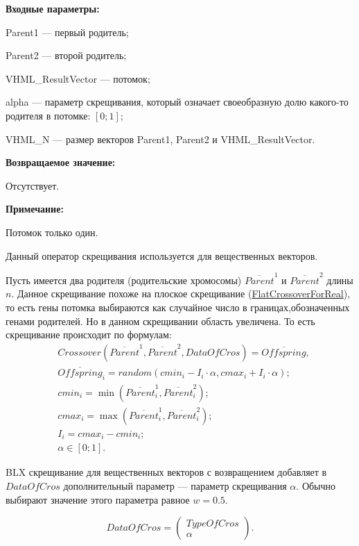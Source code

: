 \textbf{Входные параметры:}
 
Parent1 --- первый родитель;
 
Parent2 --- второй родитель;
 
VHML\_ResultVector --- потомок;

alpha --- параметр скрещивания, который означает своеобразную долю какого-то родителя в потомке: $[0;1]$;
 
VHML\_N --- размер векторов Parent1, Parent2 и VHML\_ResultVector.

\textbf{Возвращаемое значение:}

 Отсутствует.
 
\textbf{ Примечание:}

Потомок только один.
 
Данный оператор скрещивания используется для вещественных векторов.

Пусть имеется два родителя (родительские хромосомы) $ \overline{Parent}^1 $ и $ \overline{Parent}^2$ длины $n$. Данное скрещивание похоже на плоское скрещивание (\hyperref[SetOfOperatorsAlgorithms:FlatCrossoverForReal]{FlatCrossoverForReal}), то есть гены потомка выбираются как случайное число в границах,обозначенных генами родителей. Но в данном скрещивании область увеличена. То есть скрещивание происходит по формулам:
\begin{align}
\label{SetOfOperatorsAlgorithms:eq:BLXCrossoverForReal}
&Crossover \left( \overline{Parent}^1, \overline{Parent}^2, DataOfCros\right)= \overline{Offspring}, \\
& \overline{Offspring}_i=random\left(cmin_i-I_i\cdot \alpha, cmax_i+I_i\cdot \alpha\right);\nonumber\\
& cmin_i = \min\left(\overline{Parent}^1_i, \overline{Parent}^2_i \right);\nonumber\\
& cmax_i = \max\left(\overline{Parent}^1_i, \overline{Parent}^2_i \right);\nonumber\\
& I_i = cmax_i-cmin_i;\nonumber\\
&\alpha\in \left[ 0; 1\right].\nonumber
\end{align}

BLX скрещивание для вещественных векторов с возвращением добавляет в $ DataOfCros $ дополнительный параметр --- параметр скрещивания $ \alpha $. Обычно выбирают значение этого параметра равное $ w=0.5 $.

\begin{equation}
DataOfCros=\left( \begin{array}{c} TypeOfCros \\ \alpha \end{array} \right).
\end{equation}